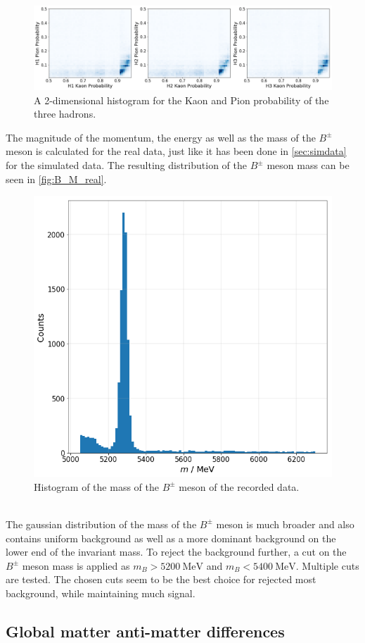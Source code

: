 \begin{figure}
  \centering
  \includegraphics[width = 1\textwidth]{"content/pics/ProbKPi.png"}

  \caption{A 2-dimensional histogram for the Kaon and Pion probability of the three hadrons.}
  \label{fig:ProbKPi}
\end{figure}
The magnitude of the momentum, the energy as well as the mass of the $B^{\pm}$ meson is calculated for the real data, just like it has been done in \autoref{sec:simdata} for the simulated data.
The resulting distribution of the $B^{\pm}$ meson mass can be seen in \autoref{fig:B_M_real}.
\begin{figure}
  \centering
  \includegraphics[width = .5\textwidth]{"content/pics/B_M_real.png"}
  \caption{Histogram of the mass of the $B^{\pm}$ meson of the recorded data.}
  \label{fig:B_M_real}
\end{figure}
\\ The gaussian distribution of the mass of the $B^{\pm}$ meson is much broader and also contains uniform background as well as a more dominant background on the lower end of the invariant mass.
To reject the background further, a cut on the $B^{\pm}$ meson mass is applied as $m_B > \qty{5200}{\mega\electronvolt}$ and $m_B < \qty{5400}{\mega\electronvolt}$. Multiple 
cuts are tested. The chosen cuts seem to be the best choice for rejected most background, while maintaining much signal.\\

\subsection{Global matter anti-matter differences}

